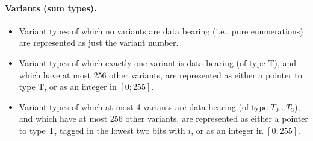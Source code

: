 \documentclass[a4paper]{report}
\begin{document}
\paragraph{Variants (sum types).}
\begin{itemize}
\item Variant types of which no variants are data bearing (i.e., pure enumerations) are represented as just the variant number.
\item Variant types of which exactly one variant is data bearing (of type T), and which have at most 256 other variants, are represented as either a pointer to type T, or as an integer in $[0;255]$.
\item Variant types of which at most 4 variants are data bearing (of type $T_0\ldots T_3$), and which have at most 256 other variants, are represented as either a pointer to type T, tagged in the lowest two bits with $i$, or as an integer in $[0;255]$.
\end{itemize}
\end{document}
